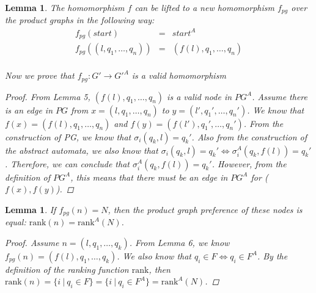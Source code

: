 \documentclass[twocolumn, openany]{sig-alternate-10pt}
\newcommand{\Rank}{\ensuremath{\mathrm{rank}}}
\newtheorem{lem}[thm]{Lemma}
\begin{document}
\begin{lem}
  The homomorphism $f$ can be lifted to a new homomorphism $f_{pg}$ over the product graphs in the following way:
  \[ \begin{array}{rcl}
    f_{pg}( start ) & = & start^A  \\
    f_{pg}( (l,q_1,\ldots,q_n) ) & = & (f(l),q_1,\ldots,q_n) \\
  \end{array} \]

  Now we prove that $f_{pg}: G' \rightarrow G'^A$ is a valid homomorphism
  \begin{proof}
    From Lemma 5, $(f(l),q_1,\ldots,q_n)$ is a valid node in $PG^A$. 
    Assume there is an edge in $PG$ from $x=(l,q_1,\ldots,q_n)$
    to $y=(l',q_1',\ldots,q_n')$. We know that $f(x) = (f(l),q_1,\ldots,q_n)$ and $f(y) = (f(l'),q_1',\ldots,q_n')$.
    From the construction of PG, we know that $\sigma_i(q_k, l) = q_k'$. 
    Also from the construction of the abstract automata, we also know that $\sigma_i(q_k, l) = q_k' \iff \sigma^A_i(q_k, f(l)) = q_k'$. Therefore, we can conclude that $\sigma^A_i(q_k, f(l)) = q_k'$. However, from the definition of $PG^A$, this means that there must be an edge in $PG^A$ for ($f(x),f(y)$).
  \end{proof}
\end{lem}


\begin{lem}
  If $f_{pg}(n) = N$, then the product graph preference of these nodes is equal: $\Rank(n) = \Rank^A(N)$.

  \begin{proof}
    Assume $n = (l,q_1,\dots,q_k)$. From Lemma 6, we know $f_{pg}(n) = (f(l),q_1,\dots,q_k)$. 
    We also know that $q_i \in F \iff q_i \in F^A$. 
    By the definition of the ranking function $\Rank$, then 
    $\Rank(n) = \{ i ~\vert~ q_i \in F \} = \{ i ~\vert~ q_i \in F^A \} = \Rank^A(N)$.
  \end{proof}

\end{lem}


\end{document}
